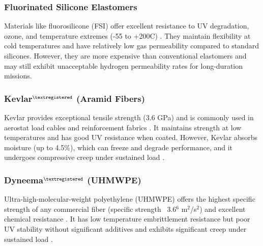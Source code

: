 \subsubsection{Fluorinated Silicone Elastomers}
Materials like fluorosilicone (FSI) offer excellent resistance to UV degradation, ozone, and temperature extremes (-55 to +200\textdegree{}C) \cite{rouse2013}. They maintain flexibility at cold temperatures and have relatively low gas permeability compared to standard silicones. However, they are more expensive than conventional elastomers and may still exhibit unacceptable hydrogen permeability rates for long-duration missions.

\subsubsection{Kevlar$^{\textregistered}$ (Aramid Fibers)}
Kevlar provides exceptional tensile strength (3.6 GPa) and is commonly used in aerostat load cables and reinforcement fabrics \cite{morgan2005}. It maintains strength at low temperatures and has good UV resistance when coated. However, Kevlar absorbs moisture (up to 4.5\%), which can freeze and degrade performance, and it undergoes compressive creep under sustained load \cite{morga2001}.

\subsubsection{Dyneema$^{\textregistered}$ (UHMWPE)}
Ultra-high-molecular-weight polyethylene (UHMWPE) offers the highest specific strength of any commercial fiber (specific strength ~3.6$^6$ m$^2$/s$^2$) and excellent chemical resistance \cite{gouella2008}. It has low temperature embrittlement resistance but poor UV stability without significant additives and exhibits significant creep under sustained load \cite{white2014}.

